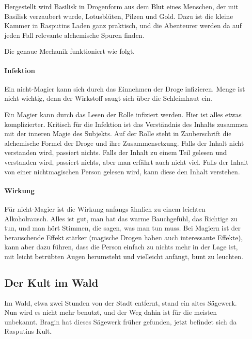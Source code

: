 \documentclass[a4paper,10pt]{scrartcl}
\def\drugname{Basilisk}
\begin{document}
Hergestellt wird \drugname{} in Drogenform aus dem Blut eines Menschen, der
mit \drugname{} verzaubert wurde, Lotusblüten, Pilzen und Gold. Dazu ist die
kleine Kammer in Rasputins Laden ganz praktisch, und die Abenteurer
werden da auf jeden Fall relevante alchemische Spuren finden.

Die genaue Mechanik funktioniert wie folgt.

\paragraph{Infektion}

Ein nicht-Magier kann sich durch das Einnehmen der Droge infizieren.
Menge ist nicht wichtig, denn der Wirkstoff saugt sich über die
Schleimhaut ein.

Ein Magier kann durch das Lesen der Rolle infiziert werden. Hier ist
alles etwas komplizierter. Kritisch für die Infektion ist das
Verständnis des Inhalts zusammen mit der inneren Magie des Subjekts. Auf
der Rolle steht in Zauberschrift die alchemische Formel der Droge und
ihre Zusammensetzung. Falls der Inhalt nicht verstanden wird, passiert
nichts. Falls der Inhalt zu einem Teil gelesen und verstanden wird,
passiert nichts, aber man erfährt auch nicht viel. Falls der Inhalt von
einer nichtmagischen Person gelesen wird, kann diese den Inhalt
verstehen.

\paragraph{Wirkung}

Für nicht-Magier ist die Wirkung anfangs ähnlich zu einem leichten
Alkoholrausch. Alles ist gut, man hat das warme Bauchgefühl, das
Richtige zu tun, und man hört Stimmen, die sagen, was man tun muss. Bei
Magiern ist der berauschende Effekt stärker (magische Drogen haben auch
interessante Effekte), kann aber dazu führen, dass die Person einfach zu
nichts mehr in der Lage ist, mit leicht betrübten Augen herumsteht und
vielleicht anfängt, bunt zu leuchten.

\subsection{Der Kult im Wald}

Im Wald, etwa zwei Stunden von der Stadt entfernt, stand ein altes
Sägewerk.  Nun wird es nicht mehr benutzt, und der Weg dahin ist für die
meisten unbekannt. Bragin hat dieses Sägewerk früher gefunden, jetzt
befindet sich da Rasputins Kult.
\end{document}

